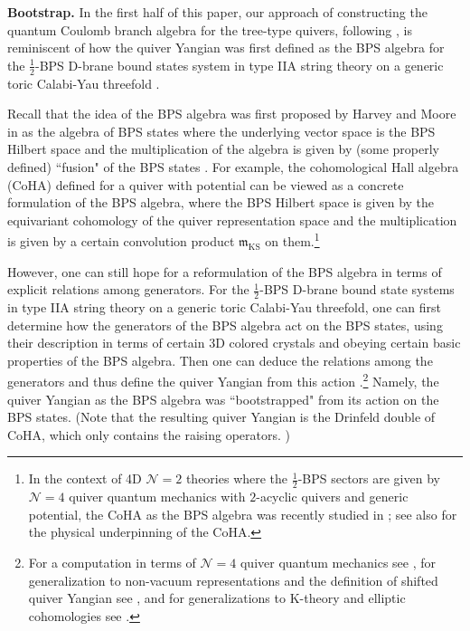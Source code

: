 \documentclass[12pt,a4paper]{article}
\renewcommand{\(}{\left(}
\renewcommand{\)}{\right)}
\renewcommand{\(}{\left(}
\renewcommand{\)}{\right)}
\begin{document}
\medskip

\noindent
\textbf{Bootstrap.}
In the first half of this paper, our approach of constructing the quantum Coulomb branch algebra for the tree-type quivers, following \cite{Bullimore:2016hdc}, is reminiscent of how the quiver Yangian was first defined as  the BPS algebra for the $\frac{1}{2}$-BPS D-brane bound states system in type IIA string theory on a generic toric Calabi-Yau threefold \cite{Li:2020rij}. 

Recall that the idea of the BPS algebra was first proposed by Harvey and Moore in \cite{Harvey:1996gc} as the algebra of BPS states where the underlying vector space is the BPS Hilbert space and the multiplication of the algebra is given by  (some properly defined) ``fusion" of the BPS states \cite{Harvey:1996gc}.
For example, the cohomological Hall algebra (CoHA) \cite{Kontsevich:2008fj,Kontsevich:2010px,Rapcak:2018nsl} defined for a quiver with potential can be viewed as a concrete formulation of the BPS algebra, where the BPS Hilbert space is given by the equivariant cohomology of the quiver representation space and the multiplication is given by a certain convolution product  $\mathfrak{m}_{\textrm{KS}}$ on them.\footnote{In the context of 4D $\mathcal{N}=2$ theories where the $\frac{1}{2}$-BPS sectors are given by $\mathcal{N}=4$ quiver quantum mechanics with $2$-acyclic quivers and generic potential, the CoHA as the BPS algebra was recently studied in \cite{Gaiotto:2024fso}; see also \cite[App.~B]{Gaiotto:2024fso} for the physical underpinning of the CoHA.
}

However, one can still hope for a reformulation of the BPS algebra in terms of explicit relations among generators. 
For the $\frac{1}{2}$-BPS D-brane bound state systems in type IIA string theory on a generic toric Calabi-Yau threefold, one can first determine how the  generators of the BPS algebra act on the BPS states, using their description in terms of certain 3D colored crystals \cite{Ooguri:2008yb} and obeying certain basic properties of the BPS algebra. Then one can deduce the relations among the generators and thus define the quiver Yangian from this action \cite{Li:2020rij}.\footnote{For a computation in terms of $\mathcal{N}=4$ quiver quantum mechanics see \cite{Galakhov:2020vyb}, for generalization to non-vacuum representations and the definition of shifted quiver Yangian see \cite{Galakhov:2021xum}, and for generalizations to K-theory and elliptic cohomologies see \cite{Galakhov:2021vbo}.}
Namely, the quiver Yangian as  the BPS algebra was ``bootstrapped" from its action on the BPS states.
(Note that the resulting quiver Yangian is the Drinfeld double of CoHA, which only contains the raising operators. )
\end{document}

